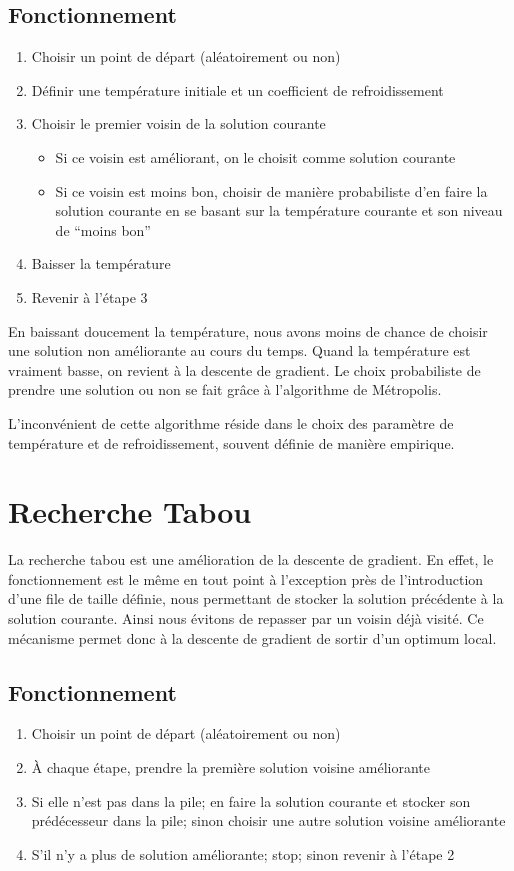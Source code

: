 \documentclass[a4paper]{article}
\begin{document}
	\subsection{Fonctionnement}
	\begin{enumerate}
		\item{Choisir un point de départ (aléatoirement ou non)}
		\item{Définir une température initiale et un coefficient de refroidissement}
		\item{Choisir le premier voisin de la solution courante}
		\begin{itemize}
			\item{Si ce voisin est améliorant, on le choisit comme solution courante}
			\item{Si ce voisin est moins bon, choisir de manière probabiliste d'en faire la solution courante en se basant sur la température courante et son niveau de ``moins bon''}
		\end{itemize}
		\item{Baisser la température}
		\item{Revenir à l'étape 3}
	\end{enumerate}

En baissant doucement la température, nous avons moins de chance de choisir une solution non améliorante au cours du temps. Quand la température est vraiment basse, on revient à la descente de gradient.
Le choix probabiliste de prendre une solution ou non se fait grâce à l’algorithme de Métropolis.

L'inconvénient de cette algorithme réside dans le choix des paramètre de température et de refroidissement, souvent définie de manière empirique. 


\section{Recherche Tabou}
La recherche tabou est une amélioration de la descente de gradient. En effet, le fonctionnement est le même en tout point à l'exception près de l'introduction d'une file de taille définie, nous permettant de stocker la solution précédente à la solution courante. Ainsi nous évitons de repasser par un voisin déjà visité. Ce mécanisme permet donc à la descente de gradient de sortir d'un optimum local.

	\subsection{Fonctionnement}
	\begin{enumerate}
		\item{Choisir un point de départ (aléatoirement ou non)}
		\item{À chaque étape, prendre la première solution voisine améliorante}
		\item{Si elle n'est pas dans la pile; en faire la solution courante et stocker son prédécesseur dans la pile; sinon choisir une autre solution voisine améliorante}
		\item{S'il n'y a plus de solution améliorante; stop; sinon revenir à l'étape 2}
	\end{enumerate}
\end{document}
